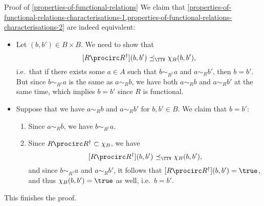 \begin{Proof}{Proof of \cref{properties-of-functional-relations}}%
    We claim that \cref{properties-of-functional-relations-characterisations-1,properties-of-functional-relations-characterisations-2} are indeed equivalent:
    \begin{itemize}
        \item{}Let $(b,b')\in B\times B$. We need to show that
            \[
                [R\procirc R^{\dagger}](b,b')%
                \preceq_{\TTV}%
                \chi_{B}(b,b'),%
            \]%
            i.e.\ that if there exists some $a\in A$ such that $b\sim_{R^{\dagger}}a$ and $a\sim_{R}b'$, then $b=b'$. But since $b\sim_{R^{\dagger}}a$ is the same as $a\sim_{R}b$, we have both $a\sim_{R}b$ and $a\sim_{R}b'$ at the same time, which implies $b=b'$ since $R$ is functional.
        \item{}Suppose that we have $a\sim_{R}b$ and $a\sim_{R}b'$ for $b,b'\in B$. We claim that $b=b'$:
            \begin{enumerate}%
                \item Since $a\sim_{R}b$, we have $b\sim_{R^{\dagger}}a$.
                \item Since $R\procirc R^{\dagger}\subset\chi_{B}$, we have
                    \[
                        [R\procirc R^{\dagger}](b,b')%
                        \preceq_{\TTV}%
                        \chi_{B}(b,b'),%
                    \]%
                    and since $b\sim_{R^{\dagger}}a$ and $a\sim_{R}b'$, it follows that $[R\procirc R^{\dagger}](b,b')=\true$, and thus $\chi_{B}(b,b')=\true$ as well, i.e.\ $b=b'$.
            \end{enumerate}%
    \end{itemize}
    This finishes the proof.
\end{Proof}
